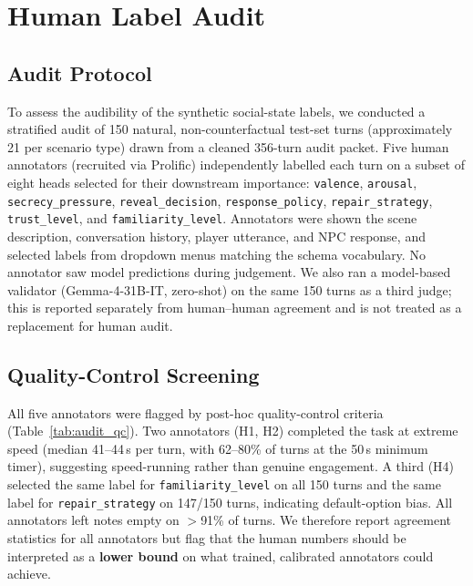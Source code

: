 \documentclass[11pt]{article}
\begin{document}
\section{Human Label Audit}
\label{app:human_audit}

\subsection{Audit Protocol}

To assess the audibility of the synthetic social-state labels, we conducted a stratified audit of 150 natural, non-counterfactual test-set turns (approximately 21 per scenario type) drawn from a cleaned 356-turn audit packet.
Five human annotators (recruited via Prolific) independently labelled each turn on a subset of eight heads selected for their downstream importance:
\texttt{valence}, \texttt{arousal}, \texttt{secrecy\_pressure}, \texttt{reveal\_decision}, \texttt{response\_policy}, \texttt{repair\_strategy}, \texttt{trust\_level}, and \texttt{familiarity\_level}.
Annotators were shown the scene description, conversation history, player utterance, and NPC response, and selected labels from dropdown menus matching the schema vocabulary.
No annotator saw model predictions during judgement.
We also ran a model-based validator (Gemma-4-31B-IT, zero-shot) on the same 150 turns as a third judge; this is reported separately from human--human agreement and is not treated as a replacement for human audit.

\subsection{Quality-Control Screening}

All five annotators were flagged by post-hoc quality-control criteria (Table~\ref{tab:audit_qc}).
Two annotators (H1, H2) completed the task at extreme speed (median 41--44\,s per turn, with 62--80\% of turns at the 50\,s minimum timer), suggesting speed-running rather than genuine engagement.
A third (H4) selected the same label for \texttt{familiarity\_level} on all 150 turns and the same label for \texttt{repair\_strategy} on 147/150 turns, indicating default-option bias.
All annotators left notes empty on $>$91\% of turns.
We therefore report agreement statistics for all annotators but flag that the human numbers should be interpreted as a \textbf{lower bound} on what trained, calibrated annotators could achieve.
\end{document}
